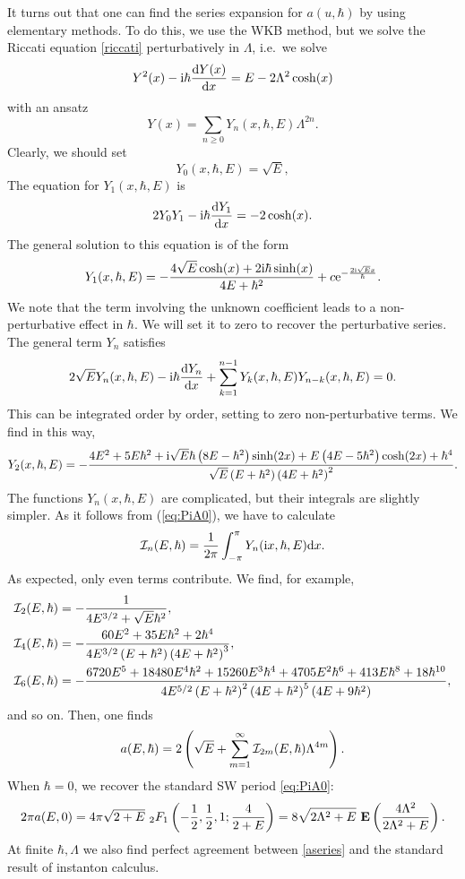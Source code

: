 \documentclass[a4paper,11pt]{article}
\theoremstyle{definition}
\newcommand{\CI}{{\cal I}}
\newcommand{\re}{{\rm e}}
\newcommand{\ri}{{\rm i}}
\newcommand{\rd}{{\rm d}}
\newcommand{\be}{\begin{equation}}
\newcommand{\ee}{\end{equation}}
\newcommand{\ba}{\begin{aligned}}
\newcommand{\ea}{\end{aligned}}
\begin{document}
It turns out that one can find the series expansion for $a(u, \hbar)$
by using elementary methods.  To do this, we use the WKB method, but we solve the Riccati
equation \eqref{riccati} perturbatively in $\Lambda$, i.e.\ we solve
%
\be
 Y^2(x)-\ri \hbar\frac{\rd Y(x)}{\rd x}=E- 2\Lambda^2 \cosh(x) 
\end{equation}
%
with an ansatz
%
\be
Y(x) = \sum_{n \ge 0} Y_n (x, \hbar, E) \Lambda^{2n}. 
\ee
%
Clearly, we should set 
%
\be
Y_0(x, \hbar, E)= {\sqrt{E}}, 
\ee
The equation for $Y_1(x, \hbar, E)$ is 
%
\be
2 Y_0 Y_1 -{\ri \hbar} {\rd Y_1 \over \rd x}= - 2 \cosh(x). 
\ee
%
The general solution to this equation is of the form 
%
\be
Y_1(x, \hbar, E)= -{4 {\sqrt{E}} \cosh(x) + 2 \ri \hbar \sinh(x) \over 4 E+ \hbar^2} + c \re^{-{2 \ri {\sqrt{E}} x\over \hbar}}. 
\ee
%
We note that the term involving the unknown coefficient leads to a
non-perturbative effect in $\hbar$. We will set it to zero to recover
the perturbative series.  The general term $Y_n$ satisfies
%
\be
2 {\sqrt{E}} Y_n(x, \hbar, E) -\ri \hbar {\rd Y_n \over \rd x}+\sum_{k=1}^{n-1} Y_k(x, \hbar, E) Y_{n-k}(x, \hbar, E)=0. 
\ee
%
This can be integrated order by order, setting to zero non-perturbative terms. We find in this way, 
%
\be
Y_2(x, \hbar, E)= -\frac{4 E^2+5 E \hbar ^2+\ri {\sqrt{E}}  \hbar  \left(8 E-\hbar ^2\right)
   \sinh (2 x)+E \left(4 E-5 \hbar ^2\right) \cosh (2 x)+\hbar ^4}{{\sqrt{E}}
    \left(E+\hbar ^2\right) \left(4 E+\hbar ^2\right)^2}. 
    \ee
    The functions $Y_n(x, \hbar, E)$ are complicated, but their integrals are slightly
    simpler. As it follows from (\ref{eq:PiA0}), we have to calculate
    \be
  \CI_n (E, \hbar)=  {1\over 2 \pi} \int_{-\pi}^\pi Y_n (\ri x, \hbar, E) \rd x. 
    \ee
As expected, only even terms contribute. We find, for example, 
 \be
   \ba
   \CI_2(E, \hbar)&=  -\frac{1}{4 E^{3/2}+{\sqrt{E}}  \hbar ^2}, \\
   \CI_4(E, \hbar)&=-\frac{60 E^2+35 E \hbar ^2+2 \hbar ^4}{4 E^{3/2} \left(E+\hbar
   ^2\right) \left(4 E+\hbar ^2\right)^3}, \\
   \CI_6(E, \hbar)&=-\frac{6720 E^5+18480E^4 \hbar ^2+15260 E^3 \hbar ^4+4705 E^2
   \hbar ^6+413 E \hbar ^8+18 \hbar ^{10}}{4 E^{5/2} \left(E+\hbar
   ^2\right)^2 \left(4 E+\hbar ^2\right)^5 \left(4 E+9 \hbar
   ^2\right)},
   \ea
   \ee
   and so on. Then, one finds
   \be
   \label{aseries}
  a(E, \hbar)= 2\left(\sqrt{E} + \sum_{m=1}^{\infty} \CI_{2m}(E, \hbar) \Lambda^{4m}\right).
   \ee
When $\hbar=0$, we recover the standard SW period \eqref{eq:PiA0}: 
   \be
2 \pi a (E, 0)=4 \pi{\sqrt{2+E}} ~_2 F_1\left( -{1\over 2}, {1\over 2}, 1; {4 \over 2+E}\right)={8} {\sqrt{2\Lambda^2+E}~} {\bf E}\left( {4\Lambda^2 \over {2\Lambda^2+E}} \right). 
   \ee
  At finite $\hbar, \Lambda$ we also find perfect agreement between \eqref{aseries} and the standard result of instanton calculus. 
  
\end{document}
